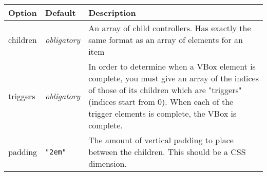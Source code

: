 \documentclass[
]{article}
\begin{document}
\begin{RaggedRight}\small\begin{longtable}[]{p{1.7in}p{1in}p{3.15in}}
\toprule
\begin{minipage}[b]{0.26\columnwidth}\raggedright
\textbf{Option}\strut
\end{minipage} & \begin{minipage}[b]{0.32\columnwidth}\raggedright
\textbf{Default}\strut
\end{minipage} & \begin{minipage}[b]{0.34\columnwidth}\raggedright
\textbf{Description}\strut
\end{minipage}\tabularnewline
\midrule
\endhead
\begin{minipage}[t]{0.26\columnwidth}\raggedright
children\strut
\end{minipage} & \begin{minipage}[t]{0.32\columnwidth}\raggedright
\emph{obligatory}\strut
\end{minipage} & \begin{minipage}[t]{0.34\columnwidth}\raggedright
An array of child controllers. Has exactly the same format as an array
of elements for an item\strut
\end{minipage}\tabularnewline
\begin{minipage}[t]{0.26\columnwidth}\raggedright
triggers\strut
\end{minipage} & \begin{minipage}[t]{0.32\columnwidth}\raggedright
\emph{obligatory}\strut
\end{minipage} & \begin{minipage}[t]{0.34\columnwidth}\raggedright
In order to determine when a VBox element is complete, you must give an
array of the indices of those of its children which are "triggers"
(indices start from 0). When each of the trigger elements is complete,
the VBox is complete.\strut
\end{minipage}\tabularnewline
\begin{minipage}[t]{0.26\columnwidth}\raggedright
padding\strut
\end{minipage} & \begin{minipage}[t]{0.32\columnwidth}\raggedright
\texttt{"2em"}\strut
\end{minipage} & \begin{minipage}[t]{0.34\columnwidth}\raggedright
The amount of vertical padding to place between the children. This
should be a CSS dimension.\strut
\end{minipage}\tabularnewline

\end{longtable}
\end{RaggedRight}
\end{document}
